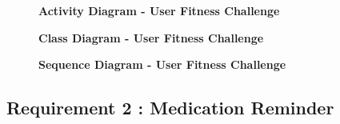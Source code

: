\documentclass{article}
\begin{document}
\clearpage

\begin{figure}[htbp]
	\textbf{Activity Diagram - User Fitness Challenge}
	\centering
	\begin{subfigure}{\textwidth}
		\resizebox{\textwidth}{!}{}
	\end{subfigure}
	\begin{subfigure}{\textwidth}
	\end{subfigure}
\end{figure}

\clearpage

\begin{figure}[htbp]
	\textbf{Class Diagram - User Fitness Challenge}
	\centering
	\begin{subfigure}{\textwidth}
		\resizebox{\textwidth}{!}{}
	\end{subfigure}
	\begin{subfigure}{\textwidth}
	\end{subfigure}
\end{figure}

\clearpage

\begin{figure}[htbp]
	\textbf{Sequence Diagram - User Fitness Challenge}
	\centering
	\begin{subfigure}{\textwidth}
		\resizebox{\textwidth}{!}{}
	\end{subfigure}
	\begin{subfigure}{\textwidth}
	\end{subfigure}
\end{figure}


\clearpage


\subsection{Requirement 2 : Medication Reminder}
\end{document}
